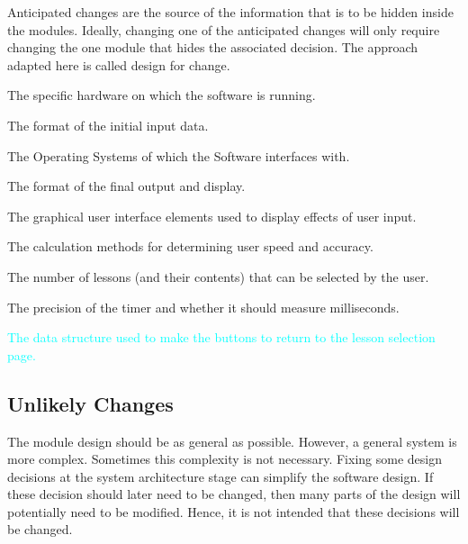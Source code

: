 \documentclass[12pt, titlepage]{article}
\newcounter{acnum}
\newcommand{\actheacnum}{AC\theacnum}
\begin{document}
Anticipated changes are the source of the information that is to be hidden
inside the modules. Ideally, changing one of the anticipated changes will only
require changing the one module that hides the associated decision. The approach
adapted here is called design for
change.

\begin{description}
\item[ \actheacnum \label{acHardware}:] The specific hardware on which the software is running.
\item[ \actheacnum \label{acInput}:] The format of the initial input data.
\item[ \actheacnum \label{acOS}:] The Operating Systems of which the Software interfaces with.
\item[ \actheacnum \label{acFinalOutput}:] The format of the final output and display.
\item[ \actheacnum \label{acGUI}:] The graphical user interface elements used to display effects of user input.
\item[ \actheacnum \label{acCalculations}:] The calculation methods for determining user speed and accuracy.
\item[ \actheacnum \label{acLessons}:] The number of lessons (and their contents) that can be selected by the user.
\item[ \actheacnum \label{acTimer}:] The precision of the timer and whether it should measure milliseconds.
\textcolor{cyan}{\item[\refstepcounter{acnum} \actheacnum \label{acButtons}:] The data structure used to make the buttons to return to the lesson selection page.}
\end{description}

\subsection{Unlikely Changes} \label{SecUchange}

The module design should be as general as possible. However, a general system is
more complex. Sometimes this complexity is not necessary. Fixing some design
decisions at the system architecture stage can simplify the software design. If
these decision should later need to be changed, then many parts of the design
will potentially need to be modified. Hence, it is not intended that these
decisions will be changed.
\end{document}

